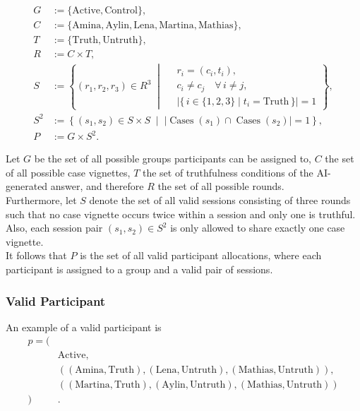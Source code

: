 \documentclass[sigconf,natbib=false]{acmart}
\begin{document}
\begin{equation}
\begin{aligned}
G &:= \{\mathrm{Active}, \mathrm{Control}\},\\
C &:= \{\mathrm{Amina}, \mathrm{Aylin}, \mathrm{Lena},
        \mathrm{Martina}, \mathrm{Mathias}\},\\
T &:= \{\mathrm{Truth}, \mathrm{Untruth}\},\\
R &:= C \times T,\\[0.5em]
S &:= \left\{
(r_1,r_2,r_3)\in R^3
\;\middle|\;
\begin{aligned}
&r_i=(c_i,t_i),\\
&c_i \neq c_j \quad \forall\, i \neq j,\\
&\bigl|\{\,i\in\{1,2,3\}\mid t_i=\mathrm{Truth}\,\}\bigr|=1
\end{aligned}
\right\},\\[0.5em]
S^2 &:= \left\{
(s_1,s_2)\in S\times S
\;\middle|\;
\bigl|\operatorname{Cases}(s_1)\cap \operatorname{Cases}(s_2)\bigr|=1
\right\},\\
P &:= G \times S^2.
\end{aligned}
\label{eq:Sets}
\end{equation}


Let $G$ be the set of all possible groups participants can be assigned to,
$C$ the set of all possible case vignettes,
$T$ the set of truthfulness conditions of the AI-generated answer,
and therefore $R$ the set of all possible rounds.\\
Furthermore, let $S$ denote the set of all valid sessions consisting of three rounds such that no case vignette occurs twice within a session and only one is truthful.
Also, each session pair $(s_1,s_2) \in S^2$ is only allowed to share exactly one case vignette.\\
It follows that $P$ is the set of all valid participant allocations, where each participant is assigned
to a group and a valid pair of sessions.


\subsubsection{Valid Participant}
An example of a valid participant is
\begin{equation*}
\begin{aligned}
p = (&\\
&\mathrm{Active},\\
&((\mathrm{Amina},\mathrm{Truth}),
  (\mathrm{Lena},\mathrm{Untruth}),
  (\mathrm{Mathias},\mathrm{Untruth})),\\
&((\mathrm{Martina},\mathrm{Truth}),
  (\mathrm{Aylin},\mathrm{Untruth}),
  (\mathrm{Mathias},\mathrm{Untruth}))\\
)&.
\end{aligned}
\end{equation*}
\end{document}
